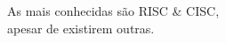\documentclass[preview]{standalone}
\begin{document}
As mais conhecidas são RISC \& CISC,\\ apesar de existirem outras.\\
\end{document}
